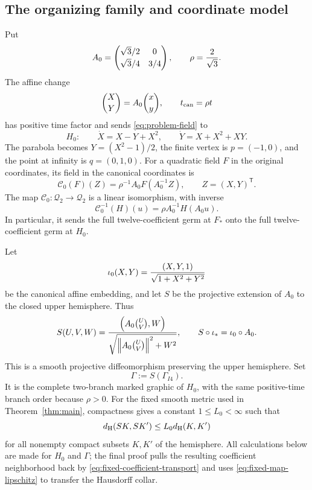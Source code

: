 \documentclass[a4paper,11pt]{article}
\numberwithin{equation}{section}
\theoremstyle{definition}
\theoremstyle{remark}
\begin{document}
\subsection{The organizing family and coordinate model}

Put
\[
 A_0=\begin{pmatrix}\sqrt3/2&0\\[2pt]\sqrt3/4&3/4\end{pmatrix},
 \qquad \rho={2\over\sqrt3}.
\]
The affine change
\begin{equation}\label{eq:canonical-change}
 \binom X Y=A_0\binom x y,
 \qquad t_{\rm can}=\rho t
\end{equation}
has positive time factor and sends \eqref{eq:problem-field} to
\begin{equation}\label{eq:base}
 H_0:\qquad \dot X=X-Y+X^2,\qquad \dot Y=X+X^2+XY.
\end{equation}
The parabola becomes $Y=(X^2-1)/2$, the finite vertex is $p=(-1,0)$,
and the point at infinity is $q=(0,1,0)$.  For a quadratic field $F$ in the
original coordinates, its field in the canonical coordinates is
\begin{equation}\label{eq:fixed-coefficient-transport}
 \mathscr C_0(F)(Z)=\rho^{-1}A_0F(A_0^{-1}Z),
 \qquad Z=(X,Y)^{\mathsf T}.
\end{equation}
The map $\mathscr C_0:\mathcal Q_2\to\mathcal Q_2$ is a linear
isomorphism, with inverse
\[
 \mathscr C_0^{-1}(H)(u)=\rho A_0^{-1}H(A_0u).
\]
In particular, it sends the full twelve-coefficient germ at $F_*$ onto the
full twelve-coefficient germ at $H_0$.

Let
\[
 \iota_0(X,Y)={ (X,Y,1)\over\sqrt{1+X^2+Y^2}}
\]
be the canonical affine embedding, and let $S$ be the projective extension
of $A_0$ to the closed upper hemisphere.  Thus
\begin{equation}\label{eq:fixed-projective-map}
 S(U,V,W)=
 {\left(A_0\binom{U}{V},W\right)
  \over\sqrt{\left\lVert A_0\binom{U}{V}\right\rVert^2+W^2}},
 \qquad S\circ\iota_*=\iota_0\circ A_0.
\end{equation}
This is a smooth projective diffeomorphism preserving the upper hemisphere.
Set
\begin{equation}\label{eq:canonical-graphic}
 \Gamma:=S(\Gamma_{I4}).
\end{equation}
It is the complete two-branch marked graphic of $H_0$, with the same
positive-time branch order because $\rho>0$.  For the fixed smooth metric
used in Theorem~\ref{thm:main}, compactness gives a constant
$1\le L_0<\infty$
such that
\begin{equation}\label{eq:fixed-map-lipschitz}
 d_{\rm H}(S K,S K')\le L_0d_{\rm H}(K,K')
\end{equation}
for all nonempty compact subsets $K,K'$ of the hemisphere.  All calculations
below are made for $H_0$ and $\Gamma$; the final proof pulls the resulting
coefficient neighborhood back by \eqref{eq:fixed-coefficient-transport} and
uses \eqref{eq:fixed-map-lipschitz} to transfer the Hausdorff collar.
\end{document}
